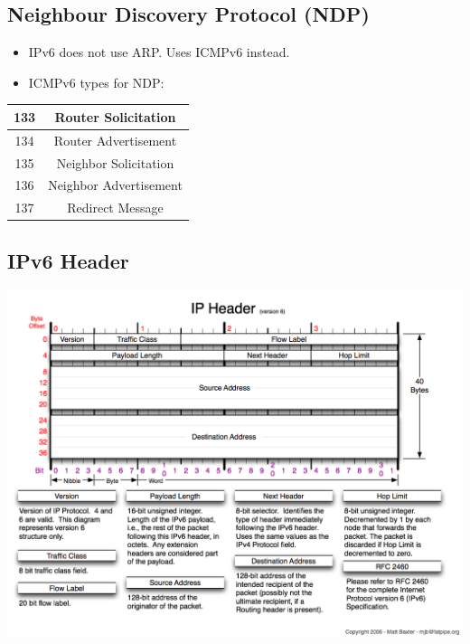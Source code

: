 \documentclass{article}
\begin{document}
	
\subsection{Neighbour Discovery Protocol (NDP)}
	
\begin{itemize}
	\item IPv6 does not use ARP. Uses ICMPv6 instead.
	\item ICMPv6 types for NDP:
\end{itemize}	

\begin{center}
  	\begin{tabular}{ | c | c | }
    	\hline
		133 & Router Solicitation \\ \hline
		134 & Router Advertisement \\ \hline
		135 & Neighbor Solicitation \\ \hline
		136 & Neighbor Advertisement \\ \hline
		137 & Redirect Message \\
		\hline
	\end{tabular}
\end{center}


\subsection{IPv6 Header}

\centerline{\includegraphics[scale=0.45]{images/IPv6-Header.png}\\[1cm]}


\newpage
\end{document}
